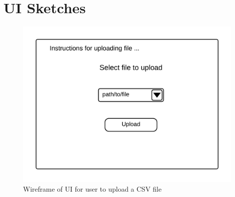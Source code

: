 \documentclass{extarticle}
\begin{document}
\appendix
\section{UI Sketches}

\begin{figure}[h!]
\label{fig:upload_csv}
\centering
\includegraphics[width=1.0\textwidth]{upload_page_wireframe}
\caption{Wireframe of UI for user to upload a CSV file}
\end{figure}
\end{document}
